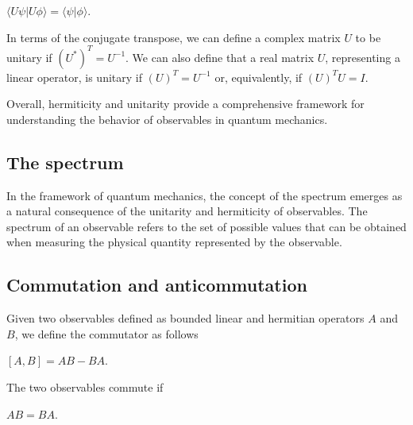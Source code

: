 \documentclass{Configuration_Files/PoliMi3i_thesis}
\begin{document}
\begin{center}
	$\langle U\psi|U\phi \rangle = \langle \psi|\phi \rangle$.
\end{center}

In terms of the conjugate transpose, we can define a complex matrix $U$ to be unitary if $ (U^*)^T=U^{-1}$. We can also define that a real matrix $U$, representing a linear operator, is unitary if $(U)^T = U^{-1}$ or, equivalently, if $(U)^T U=I$. 

Overall, hermiticity and unitarity provide a comprehensive framework for understanding the behavior of observables in quantum mechanics.


\subsection{The spectrum}

In the framework of quantum mechanics, the concept of the spectrum emerges as a natural consequence of the unitarity and hermiticity of observables. The spectrum of an observable refers to the set of possible values that can be obtained when measuring the physical quantity represented by the observable. 




\subsection{Commutation and anticommutation}

Given two observables defined as bounded linear and hermitian operators $A$ and $B$, we define the commutator as follows

\begin{center}
	$[A, B] = AB - BA$.
\end{center}

The two observables commute if

\begin{center}
	$AB = BA$.
\end{center}
\end{document}
